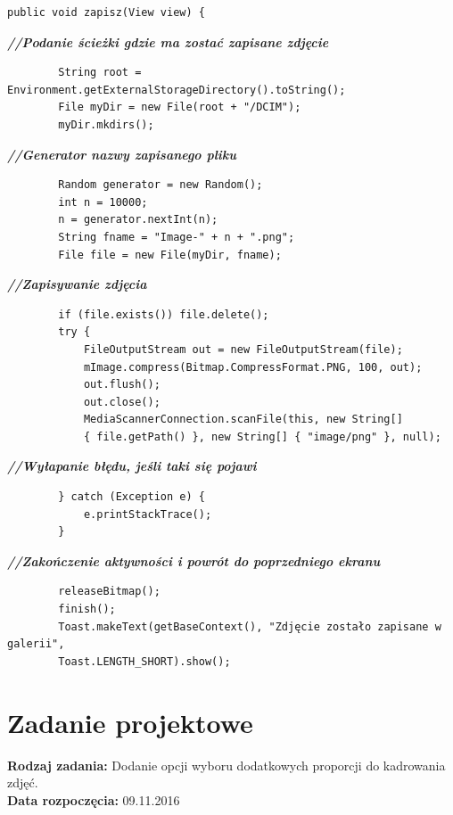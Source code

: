 \begin{verbatim}
public void zapisz(View view) { \end{verbatim}
      \textit{\textbf{//Podanie ścieżki gdzie ma zostać zapisane zdjęcie}}
        \begin{verbatim}
        String root = Environment.getExternalStorageDirectory().toString();
        File myDir = new File(root + "/DCIM");
        myDir.mkdirs();\end{verbatim}
              \textit{\textbf{//Generator nazwy zapisanego pliku}}
                \begin{verbatim}
        Random generator = new Random();
        int n = 10000;
        n = generator.nextInt(n);
        String fname = "Image-" + n + ".png";
        File file = new File(myDir, fname);\end{verbatim}
              \textit{\textbf{//Zapisywanie zdjęcia}}
                \begin{verbatim}
        if (file.exists()) file.delete();
        try {
            FileOutputStream out = new FileOutputStream(file);
            mImage.compress(Bitmap.CompressFormat.PNG, 100, out);
            out.flush();
            out.close();
            MediaScannerConnection.scanFile(this, new String[] 
            { file.getPath() }, new String[] { "image/png" }, null);\end{verbatim}
                  \textit{\textbf{//Wyłapanie błędu, jeśli taki się pojawi}}
                    \begin{verbatim}
        } catch (Exception e) {
            e.printStackTrace();
        }\end{verbatim}
              \textit{\textbf{//Zakończenie aktywności i powrót do poprzedniego ekranu}}
                \begin{verbatim}
        releaseBitmap();
        finish();
        Toast.makeText(getBaseContext(), "Zdjęcie zostało zapisane w galerii", 
        Toast.LENGTH_SHORT).show();
\end{verbatim}

\section{Zadanie projektowe}
\noindent\textbf{Rodzaj zadania:}  Dodanie opcji wyboru dodatkowych proporcji do kadrowania zdjęć.\\

\noindent\textbf{Data rozpoczęcia:} 09.11.2016\\

